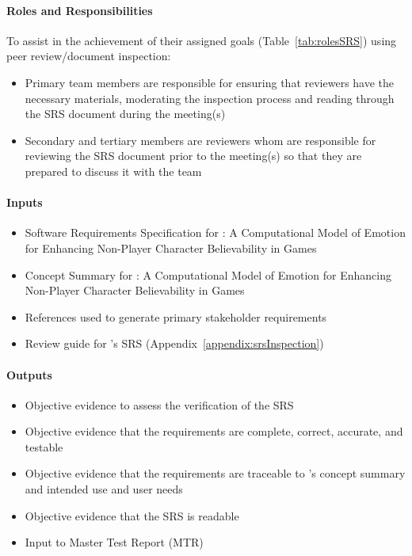 \paragraph{Roles and Responsibilities} To assist in the achievement of their
assigned goals (Table~\ref{tab:rolesSRS}) using peer review/document inspection:
\begin{itemize}

    \item Primary team members are responsible for ensuring that reviewers have
    the necessary materials, moderating the inspection process and reading
    through the SRS document during the meeting(s)

    \item Secondary and tertiary members are reviewers whom are responsible for
    reviewing the SRS document prior to the meeting(s) so that they are prepared
    to discuss it with the team

\end{itemize}

\paragraph{Inputs}
\begin{itemize}

    \item Software Requirements Specification for \progname{}: A Computational
    Model of Emotion for Enhancing Non-Player Character Believability in Games

    \item Concept Summary for \progname{}: A Computational Model of Emotion for
    Enhancing Non-Player Character Believability in Games

    \item References used to generate primary stakeholder requirements

    \item Review guide for \progname{}'s SRS
    (Appendix~\ref{appendix:srsInspection})

\end{itemize}

\paragraph{Outputs}
\begin{itemize}

    \item Objective evidence to assess the verification of the SRS

    \item Objective evidence that the requirements are complete, correct,
    accurate, and testable

    \item Objective evidence that the requirements are traceable to
    \progname{}'s concept summary and intended use and user needs

    \item Objective evidence that the SRS is readable

    \item Input to Master Test Report (MTR)

\end{itemize}

